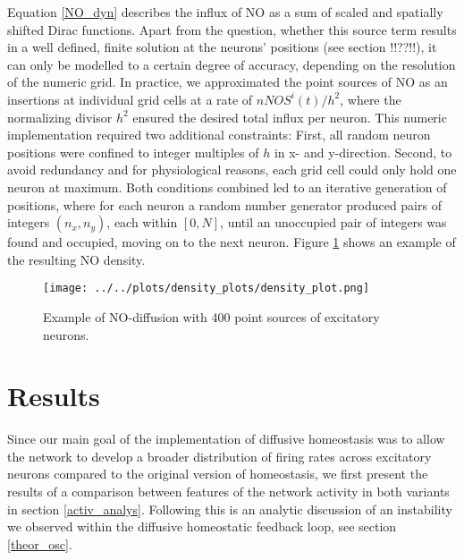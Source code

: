 \documentclass[10pt,a4paper]{article}
\begin{document}
Equation \eqref{NO_dyn} describes the influx of NO as a sum of scaled and spatially shifted Dirac functions. Apart from the question, whether this source term results in a well defined, finite solution at the neurons' positions (see section !!??!!), it can only be modelled to a certain degree of accuracy, depending on the resolution of the numeric grid. In practice, we approximated the point sources of NO as an insertions at individual grid cells at a rate of $nNOS^i(t) / h^2$, where the normalizing divisor $h^2$ ensured the desired total influx per neuron. This numeric implementation required two additional constraints: First, all random neuron positions were confined to integer multiples of $h$ in x- and y-direction. Second, to avoid redundancy and for physiological reasons, each grid cell could only hold one neuron at maximum. Both conditions combined led to an iterative generation of positions, where for each neuron a random number generator produced pairs of integers $(n_x,n_y)$, each within $[0,N]$, until an unoccupied pair of integers was found and occupied, moving on to the next neuron. Figure \ref{diff_test_plot} shows an example of the resulting NO density. 
\begin{figure}[h!]
\begin{center}
\texttt{[image: ../../plots/density\_plots/density\_plot.png]}
\end{center}
\caption{Example of NO-diffusion with 400 point sources of excitatory neurons.}
\label{diff_test_plot}
\end{figure}


\section{Results} \label{results}

Since our main goal of the implementation of diffusive homeostasis was to allow the network to develop a broader distribution of firing rates across excitatory neurons compared to the original version of homeostasis, we first present the results of a comparison between features of the network activity in both variants in section \ref{activ_analys}. Following this is an analytic discussion of an instability we observed within the diffusive homeostatic feedback loop, see section \ref{theor_osc}. 
\end{document}
